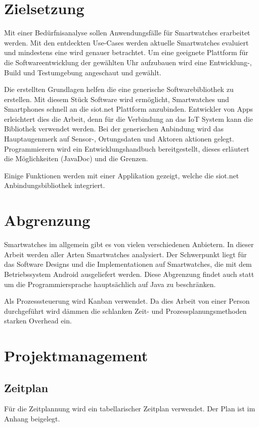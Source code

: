 \section{Zielsetzung}
Mit einer Bedürfnisanalyse sollen Anwendungsfälle für Smartwatches erarbeitet werden. Mit den entdeckten Use-Cases werden aktuelle Smartwatches evaluiert und mindestens eine wird genauer betrachtet. Um eine geeignete Plattform für die Softwareentwicklung der gewählten Uhr aufzubauen wird eine Entwicklung-, Build und Testumgebung angeschaut und gewählt.

Die erstellten Grundlagen helfen die eine generische Softwarebibliothek zu erstellen. Mit diesem Stück Software wird ermöglicht, Smartwatches und Smartphones schnell an die siot.net Plattform anzubinden. Entwickler von Apps erleichtert dies die Arbeit, denn für die Verbindung an das IoT System kann die Bibliothek verwendet werden. Bei der generischen Anbindung wird das Hauptaugenmerk auf Sensor-, Ortungsdaten und Aktoren aktionen gelegt. Programmierern wird ein Entwicklungshandbuch bereitgestellt, dieses erläutert die Möglichkeiten (JavaDoc) und die Grenzen.

Einige Funktionen werden mit einer Applikation gezeigt, welche die siot.net Anbindungsbibliothek integriert.

\section{Abgrenzung}
Smartwatches im allgemein gibt es von vielen verschiedenen Anbietern. In dieser Arbeit werden aller Arten Smartwatches analysiert. Der Schwerpunkt liegt für das Software Designs und die Implementationen auf Smartwatches, die mit dem Betriebssystem Android ausgeliefert werden. Diese Abgrenzung findet auch statt um die Programmiersprache hauptsächlich auf Java zu beschränken.

Als Prozesssteuerung wird Kanban verwendet. Da dies Arbeit von einer Person durchgeführt wird dämmen die schlanken Zeit- und Prozessplanungsmethoden starken Overhead ein.

\section{Projektmanagement}
\subsection{Zeitplan}
Für die Zeitplannung wird ein tabellarischer Zeitplan verwendet. Der Plan ist im Anhang beigelegt.


